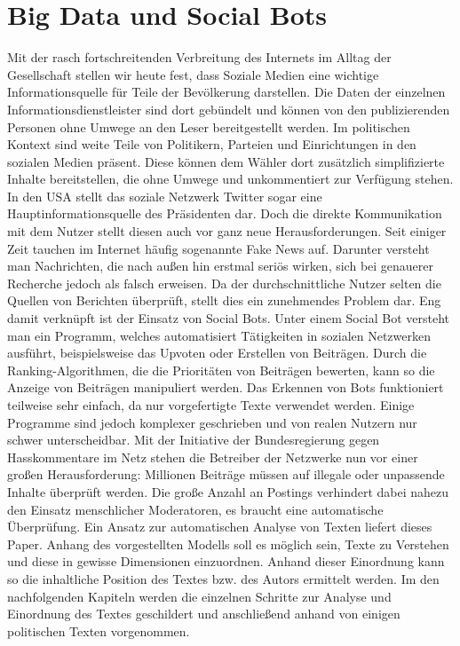 

\section{Big Data und Social Bots}
Mit der rasch fortschreitenden Verbreitung des Internets im Alltag der Gesellschaft stellen wir heute fest, dass Soziale Medien eine wichtige Informationsquelle für Teile der Bevölkerung darstellen. Die Daten der einzelnen Informationsdienstleister sind dort gebündelt und können von den publizierenden Personen ohne Umwege an den Leser bereitgestellt werden. Im politischen Kontext sind weite Teile von Politikern, Parteien und Einrichtungen in den sozialen Medien präsent. Diese können dem Wähler dort zusätzlich simplifizierte Inhalte bereitstellen, die ohne Umwege und unkommentiert zur Verfügung stehen. In den USA stellt das soziale Netzwerk Twitter sogar eine Hauptinformationsquelle des Präsidenten dar.
\newline
Doch die direkte Kommunikation mit dem Nutzer stellt diesen auch vor ganz neue Herausforderungen. Seit einiger Zeit tauchen im Internet häufig sogenannte Fake News auf. Darunter versteht man Nachrichten, die nach außen hin erstmal seriös wirken, sich bei genauerer Recherche jedoch als falsch erweisen. Da der durchschnittliche Nutzer selten die Quellen von Berichten überprüft, stellt dies ein zunehmendes Problem dar. Eng damit verknüpft ist der Einsatz von Social Bots. Unter einem Social Bot versteht man ein Programm, welches automatisiert Tätigkeiten in sozialen Netzwerken ausführt, beispielsweise das Upvoten oder Erstellen von Beiträgen. Durch die Ranking-Algorithmen, die die Prioritäten von Beiträgen bewerten, kann so die Anzeige von Beiträgen manipuliert werden. Das Erkennen von Bots funktioniert teilweise sehr einfach, da nur vorgefertigte Texte verwendet werden. Einige Programme sind jedoch komplexer geschrieben und von realen Nutzern nur schwer unterscheidbar.
\newline
Mit der Initiative der Bundesregierung gegen Hasskommentare im Netz stehen die Betreiber der Netzwerke nun vor einer großen Herausforderung: Millionen Beiträge müssen auf illegale oder unpassende Inhalte überprüft werden. Die große Anzahl an Postings verhindert dabei nahezu den Einsatz menschlicher Moderatoren, es braucht eine automatische Überprüfung. Ein Ansatz zur automatischen Analyse von Texten liefert dieses Paper. Anhang des vorgestellten Modells soll es möglich sein, Texte zu Verstehen und diese in gewisse Dimensionen einzuordnen. Anhand dieser Einordnung kann so die inhaltliche Position des Textes bzw. des Autors ermittelt werden. Im den nachfolgenden Kapiteln werden die einzelnen Schritte zur Analyse und Einordnung des Textes geschildert und anschließend anhand von einigen politischen Texten vorgenommen.

